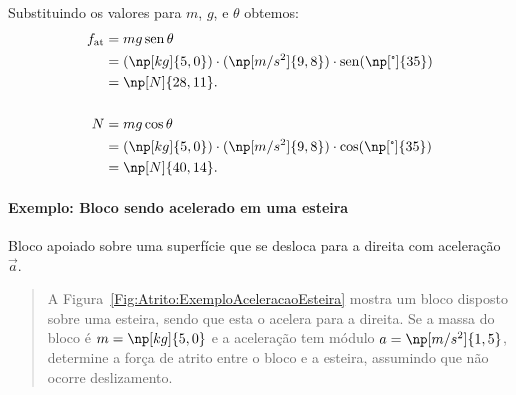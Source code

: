 \noindent{}Substituindo os valores para $m$, $g$, e $\theta$ obtemos:
\begin{align}
    f_{\rm{at}} &= mg\sen\theta \\
    &= (\np[kg]{5,0}) \cdot (\np[m/s^2]{9,8}) \cdot \sen(\np[\tcdegree]{35}) \\
    &= \np[N]{28,11}. \\
    \\
    N &= mg\cos\theta \\
    &= (\np[kg]{5,0}) \cdot (\np[m/s^2]{9,8}) \cdot \cos(\np[\tcdegree]{35}) \\
    &= \np[N]{40,14}.
\end{align}

\paragraph{Exemplo: Bloco sendo acelerado em uma esteira}

\begin{marginfigure}[2cm]
\centering
{}
\caption{Bloco apoiado sobre uma superfície que se desloca para a direita com aceleração $\vec{a}$.\label{Fig:Atrito:ExemploAceleracaoEsteira}}
\end{marginfigure}

\begin{quote}
A Figura~\ref{Fig:Atrito:ExemploAceleracaoEsteira} mostra um bloco disposto sobre uma esteira, sendo que esta o acelera para a direita. Se a massa do bloco é $m = \np[kg]{5,0}$ e a aceleração tem módulo $a = \np[m/s^2]{1,5}$, determine a força de atrito entre o bloco e a esteira, assumindo que não ocorre deslizamento.
\end{quote}

